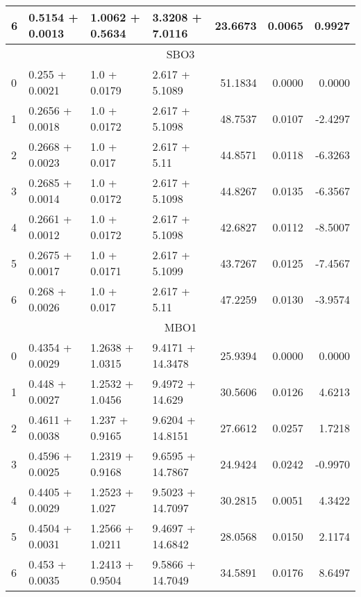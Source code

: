 \begin{tabular}{llllrrr}
  6 &  0.5154 + 0.0013 &  1.0062 + 0.5634 &  3.3208 + 7.0116 &             23.6673 &                 0.0065 &         0.9927 \\
  \midrule
  \multicolumn{7}{c}{SBO3} \\
  \midrule
  0 &   0.255 + 0.0021 &  1.0 + 0.0179 &  2.617 + 5.1089 &             51.1834 &                 0.0000 &         0.0000 \\
  1 &  0.2656 + 0.0018 &  1.0 + 0.0172 &  2.617 + 5.1098 &             48.7537 &                 0.0107 &        -2.4297 \\
  2 &  0.2668 + 0.0023 &   1.0 + 0.017 &    2.617 + 5.11 &             44.8571 &                 0.0118 &        -6.3263 \\
  3 &  0.2685 + 0.0014 &  1.0 + 0.0172 &  2.617 + 5.1098 &             44.8267 &                 0.0135 &        -6.3567 \\
  4 &  0.2661 + 0.0012 &  1.0 + 0.0172 &  2.617 + 5.1098 &             42.6827 &                 0.0112 &        -8.5007 \\
  5 &  0.2675 + 0.0017 &  1.0 + 0.0171 &  2.617 + 5.1099 &             43.7267 &                 0.0125 &        -7.4567 \\
  6 &   0.268 + 0.0026 &   1.0 + 0.017 &    2.617 + 5.11 &             47.2259 &                 0.0130 &        -3.9574 \\
  \midrule
  \multicolumn{7}{c}{MBO1} \\
  \midrule
  0 &  0.4354 + 0.0029 &  1.2638 + 1.0315 &  9.4171 + 14.3478 &             25.9394 &                 0.0000 &         0.0000 \\
  1 &   0.448 + 0.0027 &  1.2532 + 1.0456 &   9.4972 + 14.629 &             30.5606 &                 0.0126 &         4.6213 \\
  2 &  0.4611 + 0.0038 &   1.237 + 0.9165 &  9.6204 + 14.8151 &             27.6612 &                 0.0257 &         1.7218 \\
  3 &  0.4596 + 0.0025 &  1.2319 + 0.9168 &  9.6595 + 14.7867 &             24.9424 &                 0.0242 &        -0.9970 \\
  4 &  0.4405 + 0.0029 &   1.2523 + 1.027 &  9.5023 + 14.7097 &             30.2815 &                 0.0051 &         4.3422 \\
  5 &  0.4504 + 0.0031 &  1.2566 + 1.0211 &  9.4697 + 14.6842 &             28.0568 &                 0.0150 &         2.1174 \\
  6 &   0.453 + 0.0035 &  1.2413 + 0.9504 &  9.5866 + 14.7049 &             34.5891 &                 0.0176 &         8.6497 \\

\end{tabular}
